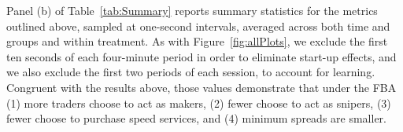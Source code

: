 \documentclass[12pt]{article}
\begin{document}
Panel (b) of Table~\ref{tab:Summary} reports summary statistics for the metrics outlined above, sampled at one-second intervals, averaged across both time and groups and within treatment. As with Figure~\ref{fig:allPlots}, we exclude the first ten seconds of each four-minute period in order to eliminate start-up effects, and we also exclude the first two periods of each session, to account for learning. Congruent with the results above, those values demonstrate that under the FBA (1) more traders choose to act as makers, (2) fewer choose to act as snipers, (3) fewer choose to purchase speed services, and (4) minimum spreads are smaller.
\begin{table}
\centering
{}
\end{table}
\end{document}
